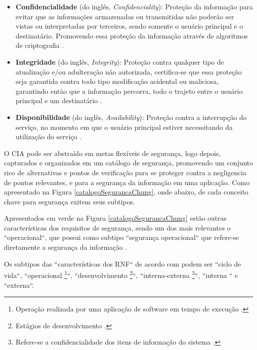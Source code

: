 \begin{itemize}
	\item \textbf{Confidencialidade} (do inglês, \textit{Confidenciality}): Proteção da informação para evitar que as informações armazenadas ou transmitidas não poderão ser vistas ou interpretadas por terceiros, sendo somente o usuário principal e o destinatário. Promovendo essa proteção da informação através de algoritmos de criptografia \cite{chung2012non} \cite{silva2007arquitetura}. 
	
	\item \textbf{Integridade} (do inglês, \textit{Integrity}): Proteção contra qualquer tipo de atualização e/ou adulteração não autorizada, certifica-se que essa proteção seja garantida contra todo tipo modificação acidental ou maliciosa, garantindo então que a informação percorra, todo o trajeto entre o usuário principal e um destinatário \cite{chung2012non} \cite{silva2007arquitetura}. 
	
	\item \textbf{Disponibilidade} (do inglês, \textit{Availability}): Proteção contra a interrupção do serviço, no momento em que o usuário principal estiver necessitando da utilização do serviço \cite{chung2012non} \cite{silva2007arquitetura}.
	  
\end{itemize}


O CIA pode ser abstraído em metas flexíveis de segurança, logo depois, capturados e organizados em um catálogo de segurança, promovendo um conjunto rico de alternativas e pontos de verificação para se proteger contra a negligencia de pontos relevantes, e para a segurança da informação em uma aplicação. Como apresentado na Figura \ref{catalogoSegurancaChung}, onde abaixo, de cada conceito chave para segurança exitem seus subtipos. 

Apresentados em  verde na Figura \ref{catalogoSegurancaChung} estão outras características dos requisitos de segurança, sendo um dos mais relevantes o ``operacional``, que possui como subtipo ``segurança operacional`` que refere-se diretamente a segurança da informação \cite{chung2012non}.

Os subtipos das ``características dos RNF`` de acordo com \cite{chung2012non} podem ser ``ciclo de vida``, ``operacional \footnote[1]{Operação realizada por uma aplicação de software em tempo de execução \cite{chung2012non}.}``, ``desenvolvimento \footnote[2]{Estágios de desenvolvimento \cite{chung2012non}.}``, ``interna-externa \footnote[3]{Refere-se a confidencialidade dos itens de informação do sistema \cite{chung2012non}.}``, ``interna `` e ``externa``.

